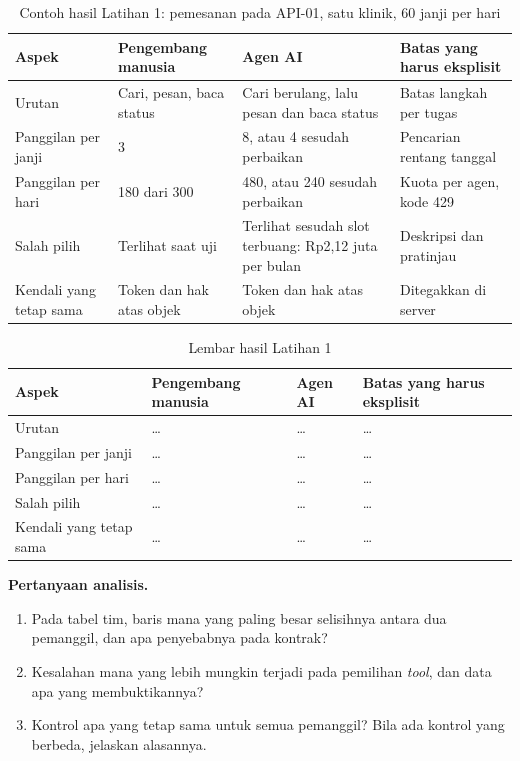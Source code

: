 \begin{table}[!htb]
  \centering
  \caption{Contoh hasil Latihan 1: pemesanan pada API-01, satu klinik, 60 janji per hari}
  \label{tab:ch14-lat1-contoh}
  \footnotesize
  \begin{tabularx}{\textwidth}{H{2.3cm}GGG}
    \hline
    \textbf{Aspek} & \textbf{Pengembang manusia} & \textbf{Agen AI} & \textbf{Batas yang harus eksplisit} \\ \hline
    Urutan & Cari, pesan, baca status & Cari berulang, lalu pesan dan baca status & Batas langkah per tugas \\ \hline
    Panggilan per janji & 3 & 8, atau 4 sesudah perbaikan & Pencarian rentang tanggal \\ \hline
    Panggilan per hari & 180 dari 300 & 480, atau 240 sesudah perbaikan & Kuota per agen, kode 429 \\ \hline
    Salah pilih & Terlihat saat uji & Terlihat sesudah slot terbuang: Rp2,12 juta per bulan & Deskripsi dan pratinjau \\ \hline
    Kendali yang tetap sama & Token dan hak atas objek & Token dan hak atas objek & Ditegakkan di server \\ \hline
  \end{tabularx}
\end{table}

\begin{table}[!htb]
  \centering
  \caption{Lembar hasil Latihan 1}
  \label{tab:ch14-lat1-hasil}
  \footnotesize
  \begin{tabularx}{\textwidth}{H{2.3cm}GGG}
    \hline
    \textbf{Aspek} & \textbf{Pengembang manusia} & \textbf{Agen AI} & \textbf{Batas yang harus eksplisit} \\ \hline
    Urutan & \dots & \dots & \dots \\ \hline
    Panggilan per janji & \dots & \dots & \dots \\ \hline
    Panggilan per hari & \dots & \dots & \dots \\ \hline
    Salah pilih & \dots & \dots & \dots \\ \hline
    Kendali yang tetap sama & \dots & \dots & \dots \\ \hline
  \end{tabularx}
\end{table}

\textbf{Pertanyaan analisis.}
\begin{enumerate}
  \item Pada tabel tim, baris mana yang paling besar selisihnya antara dua pemanggil, dan apa penyebabnya pada kontrak?
  \item Kesalahan mana yang lebih mungkin terjadi pada pemilihan \textit{tool}, dan data apa yang membuktikannya?
  \item Kontrol apa yang tetap sama untuk semua pemanggil? Bila ada kontrol yang berbeda, jelaskan alasannya.
\end{enumerate}

